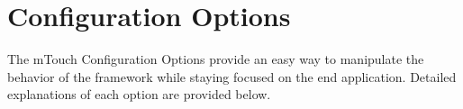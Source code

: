 \hypertarget{group___configuration}{}\section{Configuration Options}
\label{group___configuration}
The m\+Touch Configuration Options provide an easy way to manipulate the behavior of the framework while staying focused on the end application. Detailed explanations of each option are provided below. 